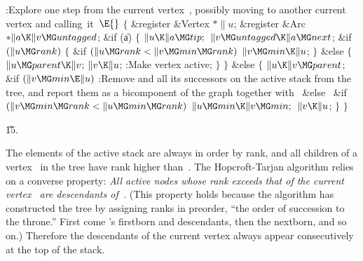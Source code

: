 \Y\B\4:Explore one step from the current vertex~, possibly moving
to another current vertex and calling~it~\X${}\E{}$\6
${}\{{}$\5
\1\&{register} \&{Vertex} ${}{*}\|u{}$;\6
\&{register} \&{Arc} ${}{*}\|a\K\|v\MG\\{untagged}{}$;\7
\&{if} (\|a)\5
${}\{{}$\1\6
${}\|u\K\|a\MG\\{tip};{}$\6
${}\|v\MG\\{untagged}\K\|a\MG\\{next}{}$;\6
\&{if} ${}(\|u\MG\\{rank}){}$\5
${}\{{}$\1\6
\&{if} ${}(\|u\MG\\{rank}<\|v\MG\\{min}\MG\\{rank}){}$\1\5
${}\|v\MG\\{min}\K\|u{}$;\2%
\6
\4${}\}{}$\5
\2\&{else}\5
${}\{{}$\1\6
${}\|u\MG\\{parent}\K\|v{}$;\6
${}\|v\K\|u{}$;\6
:Make vertex  active\X;\6
\4${}\}{}$\2\6
\4${}\}{}$\5
\2\&{else}\5
${}\{{}$\1\6
${}\|u\K\|v\MG\\{parent}{}$;\6
\&{if} ${}(\|v\MG\\{min}\E\|u){}$\1\5
:Remove  and all its successors on the active stack from the tree,
and report them as a bicomponent of the graph together with~\X\2\6
\&{else}\6
\, \&{if} ${}(\|v\MG\\{min}\MG\\{rank}<\|u\MG\\{min}\MG\\{rank}){}$\1\5
${}\|u\MG\\{min}\K\|v\MG\\{min};{}$\2\6
${}\|v\K\|u{}$;\6
\4${}\}{}$\2\6
\4${}\}{}$\2\par
\U15.\fi

The elements of the active stack are always in order by rank, and
all children of a vertex~ in the tree have rank higher than~.
The Hopcroft-Tarjan algorithm relies on a converse property:
{\sl All active nodes whose rank exceeds that of the current vertex~
are descendants of~.} (This property holds because the algorithm has
constructed the tree by assigning ranks in preorder, ``the order of
succession to the throne.'' First come 's firstborn and descendants,
then the nextborn, and so on.) Therefore the descendants of the
current vertex always appear consecutively at the top of the stack.

